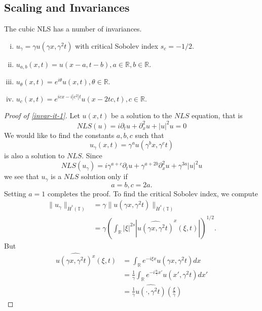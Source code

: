 \documentclass[12pt,reqno]{amsart}
\numberwithin{equation}{section}  %
\numberwithin{figure}{section}
\newcommand{\rr}{\mathbb{R}}
\newcommand{\ci}{\mathbb{T}}
\newcommand{\wh}{\widehat}
\newcommand{\p}{\partial}
\theoremstyle{plain}
\theoremstyle{definition}
\theoremstyle{remark}
\begin{document}
\begin{appendices}
\section{Scaling and Invariances}
The cubic NLS has a number of invariances. 
\begin{enumerate}[(i)]
  \item{ $u_{\gamma} = \gamma u(\gamma x, \gamma^{2} t)$ with critical Sobolev index
    $s_{c} = -1/2$}.
    \label{invar-it-1}
  \item{ $u_{a,b}(x,t) = u(x -a, t - b), a \in \rr, b \in \rr$}.
    \label{invar-it-2}
  \item{ $u_{\theta}(x,t) = e^{i \theta} u(x, t), \theta \in \rr$}.
    \label{invar-it-3}
  \item{ $u_{c}(x,t) = e^{icx - i| c^{2} |t}u(x -2tc, t), c \in \rr$}.
    \label{invar-it-4}
\end{enumerate}
%
%
\begin{proof}[Proof of \eqref{invar-it-1}]
Let $u(x, t)$ be a solution to the $NLS$ equation, that is
%
$$
NLS(u)=
i \p_t u + \p_x^{2} u  + | u |^{2} u  = 0
$$
%
We would like to find the constants
$a, b, c$ such that
\[
u_\gamma (x, t) = \gamma^a u(\gamma^b x, \gamma^c t)
\]
is also a solution to $NLS$.  Since 
$$
NLS(u_\gamma)=
i \gamma^{a + c} \p_t u + \gamma^{a + 2b} \p_x^{2} u  + \gamma^{3a} | u |^{2} u 
$$
we see that $u_\gamma$ is a $NLS$ solution only if
$$
a=b, c = 2a.
$$
Setting $a=1$ completes the proof. 
To find the critical Sobolev index, we compute
%
%
\begin{equation}
\begin{split}
  \| u_{\gamma} \|_{\dot{H}^s(\ci)} 
  & = \gamma \| u(\gamma x, \gamma^2 t) \|_{\dot{H}^{s}(\ci)}
  \\
  & = \gamma \left( \int_{\rr} | \xi |^{2s} | \wh{u(\gamma x,
  \gamma^{2} t)}^x (\xi, t)| \right)^{1/2}.
\end{split}
\label{crit-ind-comp}
\end{equation}
%
But
%
%
\begin{equation*}
\begin{split}
  \wh{u(\gamma x, \gamma^{2}t)^x}(\xi, t)
  & = \int_{\rr}e^{-i\xi x}u(\gamma x, \gamma^2 t) dx
  \\
  & = \frac{1}{\gamma} \int_{\rr}e^{-i \frac{n}{\gamma} x'}u(x',
  \gamma^{2} t) dx'
  \\
  & = \frac{1}{\gamma} \wh{u(\cdot, \gamma^{2}t)}(\frac{\xi}{\gamma})
\end{split}
\end{equation*}
%
%

\end{proof}
\end{appendices}
\end{document}
